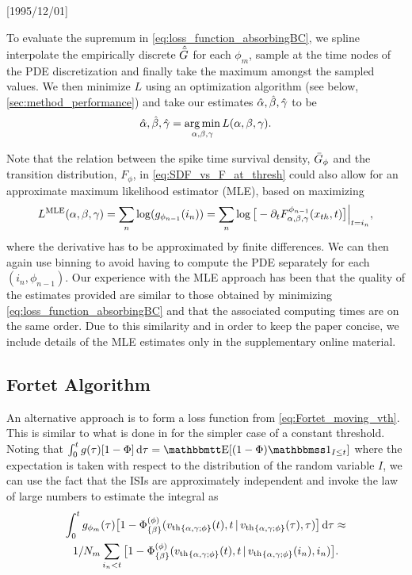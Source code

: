 \NeedsTeXFormat{LaTeX2e}[1995/12/01] \documentclass[10pt]{bmc_article}
\newenvironment{bmcformat}{\begin{raggedright}\baselineskip20pt\sloppy\setboolean{publ}{false}}{\end{raggedright}\baselineskip20pt\sloppy}
\begin{document}
\begin{bmcformat}
To evaluate the supremum in \cref{eq:loss_function_absorbingBC}, we
spline interpolate the empirically discrete ${ \hat{{ \bar{G} }} }$ for each $\phi_m$, sample at
the time nodes of the PDE discretization and 
finally take the maximum amongst the sampled values.
We then minimize $L$ using an optimization algorithm (see below,
\cref{sec:method_performance}) and take our estimates ${{{ \hat{{\alpha}} }, { \hat{{\beta}} }, { \hat{{\gamma }} }} }$ to be
$$
\abgest = \argmin_{\abg} L(\abg).
$$

Note that the relation between the spike time survival density, ${ \bar{G} }_{\phi}$ and
the transition distribution, $F_{\phi}$, in \cref{eq:SDF_vs_F_at_thresh} could
also allow for an approximate maximum likelihood estimator (MLE), based on
maximizing 
$$
L^{\textrm{MLE}}({\alpha},{\beta},{\gamma }) = \sum_n  \log ( g_{\phi_{n-1}}(i_n) )
= \sum_n \log \big[ -{\partial}_t F^{\phi_{n-1}}_{{\alpha},{\beta},{\gamma }}({ x_{th} }, t) \big] \Big|_{t =
i_n},
 $$ where the derivative has to be approximated by finite differences. We
can then again use binning to avoid having to compute the PDE separately for
each $(i_n, \phi_{n-1})$. Our experience with the MLE approach has been that the
quality of the estimates provided are similar to those obtained by minimizing
\cref{eq:loss_function_absorbingBC} and that the associated computing times are
on the same order. Due to this similarity and in order to keep the paper
concise, we include details of the MLE estimates only in the supplementary
online material.
\subsection{Fortet Algorithm}
An alternative approach is to form a loss function from
\cref{eq:Fortet_moving_vth}. This is similar to what is done in
\cite{Ditlevsen2008,Ditlevsen2007} for the simpler case of a constant threshold.
Noting that $\int_0^t g (\t) [1-\F ] \intd{\t} = \Exp[ (1 - \F ) \charf_{I \leq
t} ]$ where the expectation is taken with respect to the distribution of the
random variable $I$, we can use the fact that the ISIs are approximately
independent and invoke the law of large numbers to estimate the integral as
\begin{multline*}
\int_0^t g_{\phi_m}({\tau}) 
\big[1-{\Phi}^{(\phi)}_{\{{\beta}\}}({ v_{\textrm{th} } }_{\{{\alpha},{\gamma };\phi\}}(t),  t \,|\,
{ v_{\textrm{th} } }_{\{{\alpha},{\gamma };\phi\}}({\tau}), {\tau}) \big] \, \mathrm{d} {\tau} \approx 
\\
1/N_m \sum_{{ i_n} < t} 
\big[1
- {\Phi}^{(\phi)}_{\{{\beta}\}}({ v_{\textrm{th} } }_{\{{\alpha},{\gamma };\phi\}}(t), t \,|\,
{ v_{\textrm{th} } }_{\{{\alpha},{\gamma };\phi\}}({ i_n}),{ i_n} )\big].
\end{multline*}



\end{bmcformat}
\end{document}

